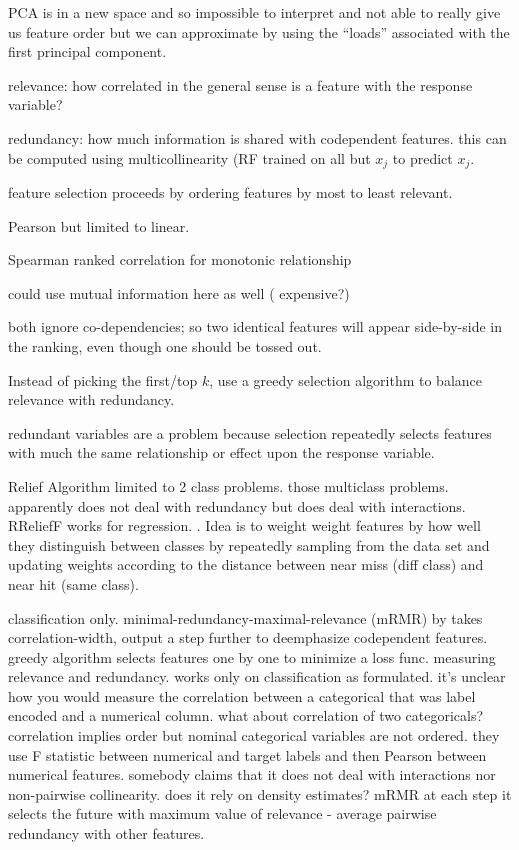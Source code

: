 \documentclass[12pt]{article}
\newcommand{\todo}[1]{{{\color{red}{[#1]}}}}
\begin{document}
PCA is in a new space and so impossible to interpret and not able to really give us feature order but we can approximate by using the ``loads'' associated with the first principal component.

 relevance: how correlated in the general sense is a feature with the response variable?
 
 redundancy:  how much information is shared with codependent features. this can be computed using multicollinearity (RF trained on all but $x_j$ to predict $x_j$.
 
 feature selection proceeds by ordering features by most to least relevant. 
 
Pearson but limited to linear.

Spearman ranked correlation  for monotonic relationship

 could use mutual information here as well ( expensive?)
 
 both ignore co-dependencies; so two identical features will appear side-by-side in the ranking, even though one should be tossed out.

Instead of picking the first/top $k$, use a greedy selection algorithm to balance relevance with redundancy.

redundant variables are a problem because selection repeatedly selects features with much the same relationship or effect upon the response variable.

\todo{We deal with all possible combinations for codependency's because of the nature of the partial dependence mechanism.}

Relief Algorithm \cite{relief} limited to 2 class problems. \cite{ReliefF}  those multiclass problems. apparently does not deal with redundancy but does deal with interactions. RReliefF works for regression. \cite{RReliefF}. Idea is to weight weight features by how well they distinguish between classes by repeatedly sampling from the data set and updating weights according to the distance between near miss (diff class) and near hit (same class).

 classification only. minimal-redundancy-maximal-relevance (mRMR) by \cite{mRMR}  takes correlation-width, output a step further to deemphasize codependent features. greedy algorithm selects features one by one to minimize a loss func.  measuring relevance and redundancy.  works only on classification as formulated. it's unclear how you would measure the correlation between a categorical that was label encoded and a numerical column. what about correlation of two categoricals? correlation implies order but nominal categorical variables are not ordered. they use F statistic between numerical and target labels and then Pearson between numerical features. somebody claims that it does not deal with interactions nor non-pairwise collinearity. does it rely on density estimates? mRMR  at each step it selects the future with maximum value of relevance - average pairwise redundancy with other features. \todo{should we bother putting in the equation?}
 
\end{document}
